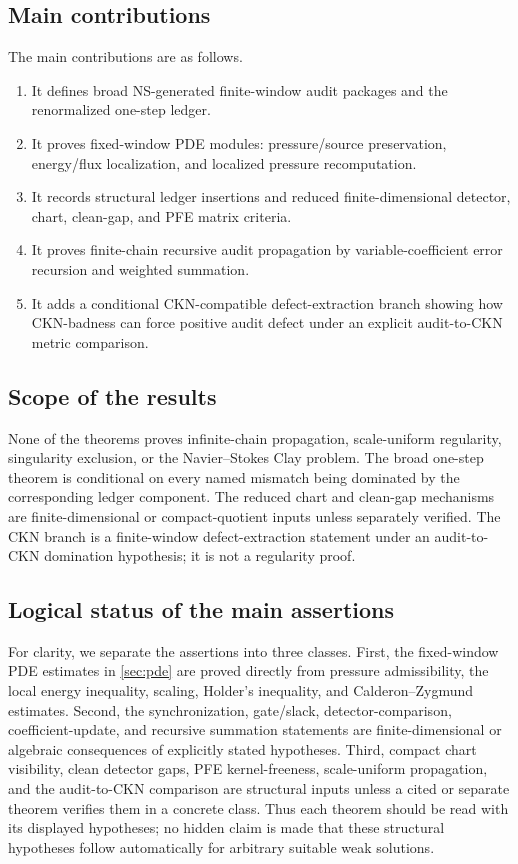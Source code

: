 \documentclass[11pt]{article}
\numberwithin{equation}{section}
\theoremstyle{plain}
\theoremstyle{definition}
\theoremstyle{remark}
\begin{document}
\subsection{Main contributions}

The main contributions are as follows.
\begin{enumerate}[label=(\roman*)]
  \item It defines broad NS-generated finite-window audit packages and the renormalized one-step ledger.
  \item It proves fixed-window PDE modules: pressure/source preservation, energy/flux localization, and localized pressure recomputation.
  \item It records structural ledger insertions and reduced finite-dimensional detector, chart, clean-gap, and PFE matrix criteria.
  \item It proves finite-chain recursive audit propagation by variable-coefficient error recursion and weighted summation.
  \item It adds a conditional CKN-compatible defect-extraction branch showing how CKN-badness can force positive audit defect under an explicit audit-to-CKN metric comparison.
\end{enumerate}

\subsection{Scope of the results}

None of the theorems proves infinite-chain propagation, scale-uniform regularity, singularity exclusion, or the Navier--Stokes Clay problem.  The broad one-step theorem is conditional on every named mismatch being dominated by the corresponding ledger component.  The reduced chart and clean-gap mechanisms are finite-dimensional or compact-quotient inputs unless separately verified.  The CKN branch is a finite-window defect-extraction statement under an audit-to-CKN domination hypothesis; it is not a regularity proof.

\subsection{Logical status of the main assertions}

For clarity, we separate the assertions into three classes.  First, the fixed-window PDE estimates in \cref{sec:pde} are proved directly from pressure admissibility, the local energy inequality, scaling, Holder's inequality, and Calderon--Zygmund estimates.  Second, the synchronization, gate/slack, detector-comparison, coefficient-update, and recursive summation statements are finite-dimensional or algebraic consequences of explicitly stated hypotheses.  Third, compact chart visibility, clean detector gaps, PFE kernel-freeness, scale-uniform propagation, and the audit-to-CKN comparison are structural inputs unless a cited or separate theorem verifies them in a concrete class.  Thus each theorem should be read with its displayed hypotheses; no hidden claim is made that these structural hypotheses follow automatically for arbitrary suitable weak solutions.
\end{document}
